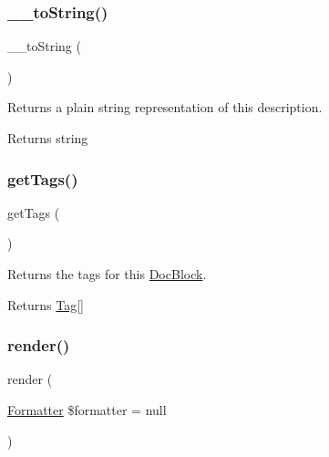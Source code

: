 \subsubsection{\texorpdfstring{\+\_\+\+\_\+to\+String()}{\_\_toString()}}
{\footnotesize\ttfamily \+\_\+\+\_\+to\+String (\begin{DoxyParamCaption}{ }\end{DoxyParamCaption})}

Returns a plain string representation of this description.

\begin{DoxyReturn}{Returns}
string 
\end{DoxyReturn}
\mbox{\label{classphp_documentor_1_1_reflection_1_1_doc_block_1_1_description_ae07173ab06a20e2f5bd928cc0518e01f}} 
\subsubsection{\texorpdfstring{get\+Tags()}{getTags()}}
{\footnotesize\ttfamily get\+Tags (\begin{DoxyParamCaption}{ }\end{DoxyParamCaption})}

Returns the tags for this \mbox{\hyperlink{classphp_documentor_1_1_reflection_1_1_doc_block}{Doc\+Block}}.

\begin{DoxyReturn}{Returns}
\mbox{\hyperlink{interfacephp_documentor_1_1_reflection_1_1_doc_block_1_1_tag}{Tag}}\mbox{[}\mbox{]} 
\end{DoxyReturn}
\mbox{\label{classphp_documentor_1_1_reflection_1_1_doc_block_1_1_description_ac20fbfe3216d76776b5e743bd16427f9}} 
\subsubsection{\texorpdfstring{render()}{render()}}
{\footnotesize\ttfamily render (\begin{DoxyParamCaption}\item[{\mbox{\hyperlink{interfacephp_documentor_1_1_reflection_1_1_doc_block_1_1_tags_1_1_formatter}{Formatter}}}]{\$formatter = {\ttfamily null} }\end{DoxyParamCaption})}

